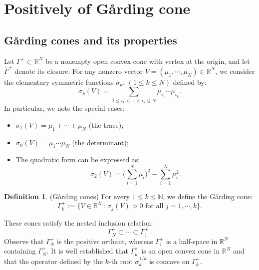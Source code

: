 \documentclass[12pt, twoside]{article}
\theoremstyle{definition}
\newtheorem{definition}[theorem]{Definition}
\numberwithin{equation}{section}
\begin{document}
\section{Positively of Gårding cone}
\subsection{Gårding cones and its properties}
Let $\Gamma^{+} \subset \mathbb{R}^{N}$ be a nonempty open convex cone with vertex at the origin, and let $\overline{\Gamma}^{+}$ denote its closure. For any nonzero vector $V=(\mu_{1},\cdots,\mu_{N})\in \mathbb{R}^{N}$, we consider the elementary symmetric functions $\sigma_{k}$, $(1\leq k\leq N)$  defined by:
\begin{equation}\label{kth elementary symmetric}
\sigma_{k}(V)=\sum_{1\leq i_1<\cdots< i_{k}\leq N}\mu_{i_1} \cdots  \mu_{i_{k}}.
\end{equation}
In particular, we note the special cases:
\begin{itemize}
\item[(i)] $\sigma_{1}(V)=\mu_{1}+\cdots+\mu_{N}$ (the trace);
\item[(ii)]$\sigma_{n}(V)=\mu_{1}\cdots \mu_{N}$ (the determinant);
\item[(iii)] The quadratic form can be expressed as:
\begin{equation}\label{sigma 2 definition}
\sigma_{2}(V)=\Big(\sum_{i=1}^{N}\mu_{i}\Big)^{2}-\sum_{i=1}^{N}\mu_{i}^{2}.
\end{equation}
\end{itemize}
\begin{definition}(Gårding cones)
For every $1\leq k\leq\mathbb{N}$, we define the Gårding cone:
$$\Gamma^{+}_{k}:=\{ V\in \mathbb{R}^N \,: \,\sigma_{j}(V)>0 \textrm{ for all } j=1,\cdots,k\}.$$
\end{definition}
These cones satisfy the nested inclusion relation:
\begin{equation}\label{Gamma inclusion}
\Gamma^{+}_{N}\subset \cdots \subset \Gamma^{+}_{1}\,.
\end{equation}
Observe that $\Gamma^{+}_{N}$ is the positive orthant, whereas $\Gamma^{+}_{1}$ is a half-space in $\mathbb{R}^{N}$ containing $\Gamma^{+}_{N}$. It is well established that $\Gamma^{+}_{k}$ is an open convex cone in $\mathbb{R}^N$ and that the operator defined by the $k$-th root $\sigma_{k}^{1/k}$ is concave on $\Gamma^{+}_{k}$.
\end{document}
